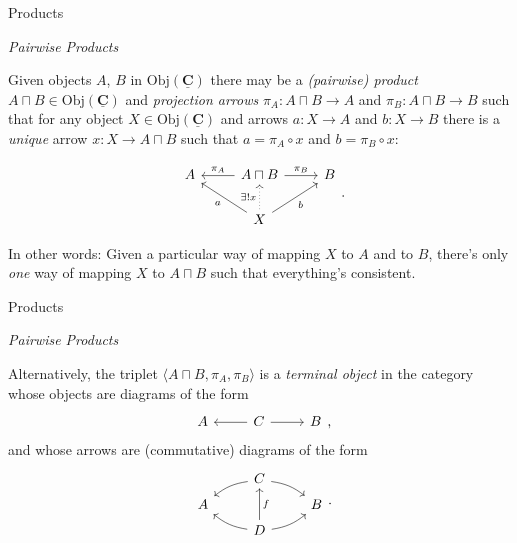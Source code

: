 \documentclass[10pt]{beamer}
\newcommand{\Cat}[1]{\ensuremath{\underline{\mathbf{#1}}}}
\newcommand{\Obj}[1]{\ensuremath{\mathrm{Obj}(\Cat{#1})}}
\theoremstyle{definition}
\theoremstyle{remark}
\numberwithin{equation}{section}
\begin{document}
\begin{frame}[fragile]{Products}

  \emph{Pairwise Products}

  Given objects $A$, $B$ in $\Obj{C}$ there may be a \emph{(pairwise) product}
  $A\sqcap B \in \Obj{C}$ and \emph{projection arrows} $\pi_A \colon A \sqcap B \rightarrow A$ and $\pi_B
  \colon A \sqcap B \rightarrow B$ such that for any object $X \in \Obj{C}$ and arrows $a \colon X \rightarrow
  A$ and $b \colon X \rightarrow B$ there is a \emph{unique} arrow $x : X \rightarrow A \sqcap B$ such that $a = \pi_A \circ x$ and $b = \pi_B \circ x$:

  \[
  \begin{tikzcd}
    A & A\sqcap B \arrow[swap]{l}{\pi_{A}} \arrow{r}{\pi_{B}} & B \\
    & X \arrow[dotted]{u}{\exists! x} \arrow{ul}{a} \arrow[swap]{ur}{b} & 
  \end{tikzcd}\rlap{.}
  \]

  In other words: Given a particular way of mapping $X$ to $A$ and to $B$, there's only \emph{one} way of mapping $X$ to $A \sqcap B$ such that everything's consistent.

\end{frame}

\begin{frame}[fragile]{Products}

  \emph{Pairwise Products}

  Alternatively, the triplet $\langle {A \sqcap B, \pi_A, \pi_B} \rangle$ is a \emph{terminal object}
  in the category whose objects are diagrams of the form
  \[
    \begin{tikzcd}
      A & C \arrow{l} \arrow{r} & B
    \end{tikzcd}\rlap{,}
  \]
  and whose arrows are (commutative) diagrams of the form
  \[
    \begin{tikzcd}[row sep=tiny]
       & C \arrow[bend right=15]{dl} \arrow[bend left=15]{dr} & \\
      A & & B \\
       & D \arrow[bend left=15]{ul} \arrow[swap]{uu}{f} \arrow[bend right=15]{ur} & 
    \end{tikzcd}\rlap{.}
  \]

\end{frame}
\end{document}
